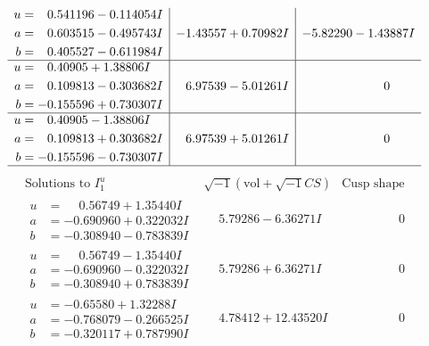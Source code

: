\documentclass[1p]{elsarticle_modified}
\theoremstyle{definition}
\newcommand{\I}{\sqrt{-1}}
\begin{document}
$$\begin{array}{c|c|c}
\begin{aligned}
u &= \phantom{-}0.541196 - 0.114054 I \\
a &= \phantom{-}0.603515 - 0.495743 I \\
b &= \phantom{-}0.405527 - 0.611984 I\end{aligned}
 & -1.43557 + 0.70982 I & -5.82290 - 1.43887 I \\ \hline\begin{aligned}
u &= \phantom{-}0.40905 + 1.38806 I \\
a &= \phantom{-}0.109813 - 0.303682 I \\
b &= -0.155596 + 0.730307 I\end{aligned}
 & \phantom{-}6.97539 - 5.01261 I & \phantom{-0.000000 } 0 \\ \hline\begin{aligned}
u &= \phantom{-}0.40905 - 1.38806 I \\
a &= \phantom{-}0.109813 + 0.303682 I \\
b &= -0.155596 - 0.730307 I\end{aligned}
 & \phantom{-}6.97539 + 5.01261 I & \phantom{-0.000000 } 0\\
 \hline 
 \end{array}$$\newpage$$\begin{array}{c|c|c}  
\text{Solutions to }I^u_{1}& \I (\text{vol} + \sqrt{-1}CS) & \text{Cusp shape}\\
 \hline 
\begin{aligned}
u &= \phantom{-}0.56749 + 1.35440 I \\
a &= -0.690960 + 0.322032 I \\
b &= -0.308940 - 0.783839 I\end{aligned}
 & \phantom{-}5.79286 - 6.36271 I & \phantom{-0.000000 } 0 \\ \hline\begin{aligned}
u &= \phantom{-}0.56749 - 1.35440 I \\
a &= -0.690960 - 0.322032 I \\
b &= -0.308940 + 0.783839 I\end{aligned}
 & \phantom{-}5.79286 + 6.36271 I & \phantom{-0.000000 } 0 \\ \hline\begin{aligned}
u &= -0.65580 + 1.32288 I \\
a &= -0.768079 - 0.266525 I \\
b &= -0.320117 + 0.787990 I\end{aligned}
 & \phantom{-}4.78412 + 12.43520 I & \phantom{-0.000000 } 0 \\ \hline\begin{aligned}

\end{aligned}
\end{array}$$
\end{document}
